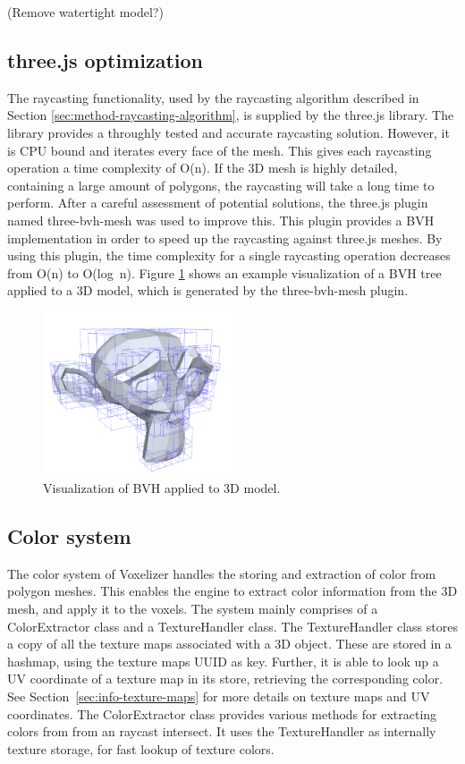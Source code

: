 (\colorbox{RubineRed}{Remove watertight model?}) 

\subsection{three.js optimization}
The raycasting functionality, used by the raycasting algorithm described in Section \ref{sec:method-raycasting-algorithm}, is supplied by the three.js library. The library provides a throughly tested and accurate raycasting solution. However, it is CPU bound and  iterates every face of the mesh. This gives each raycasting operation a time complexity of O(n). If the 3D mesh is highly detailed, containing a large amount of polygons, the raycasting will take a long time to perform. After a careful assessment of potential solutions, the three.js plugin named three-bvh-mesh \cite{three-bvh-mesh} was used to improve this. This plugin provides a BVH implementation in order to speed up the raycasting against three.js meshes. By using this plugin, the time complexity for a single raycasting operation decreases from O(n) to O(log~n). Figure \ref{fig:bvh-monkey} shows an example visualization of a BVH tree applied to a 3D model, which is generated by the three-bvh-mesh plugin.

\begin{figure}[ht]
    \centering
    \includegraphics[width=0.5\textwidth]{sections/methodology/figures/bvh-monkey.png}
    \caption{Visualization of BVH applied to 3D model.}
    \label{fig:bvh-monkey}
\end{figure}

\subsection{Color system}
The color system of Voxelizer handles the storing and extraction of color from polygon meshes. This enables the engine to extract color information from the 3D mesh, and apply it to the voxels. The system mainly comprises of a ColorExtractor class and a TextureHandler class. The TextureHandler class stores a copy of all the texture maps associated with a 3D object. These are stored in a hashmap, using the texture maps UUID as key. Further, it is able to look up a UV coordinate of a texture map in its store, retrieving the corresponding color. See Section~\ref{sec:info-texture-maps} for more details on texture maps and UV coordinates. The ColorExtractor class provides various methods for extracting colors from from an raycast intersect. It uses the TextureHandler as internally texture storage, for fast lookup of texture colors. 


